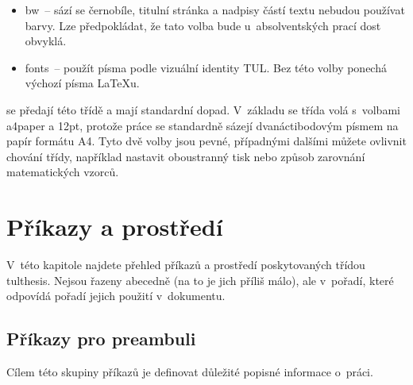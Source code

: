 \documentclass[FZS,DP,EN]{tulthesis}
\newcommand{\argument}[1]{{\ttfamily\color{\tulcolor}#1}}
\newcommand{\argumentindex}[1]{\argument{#1}\index{#1}}
\begin{document}
\begin{description}
\begin{itemize}
\item \argumentindex{bw}~-- sází se černobíle, titulní stránka a nadpisy částí
textu nebudou používat barvy. Lze předpokládat, že tato volba bude
u~absolventských prací dost obvyklá.

\item \argumentindex{fonts}~-- použít písma podle vizuální identity TUL. Bez
této volby ponechá výchozí písma \LaTeX u.
\end{itemize}

\item[Volby třídy \argument{report} (resp. \argument{article})] se předají této
třídě a mají standardní dopad. V~základu se třída volá s~volbami
\argument{a4paper} a \argument{12pt}, protože práce se standardně sázejí
dvanáctibodovým písmem na papír formátu A4. Tyto dvě volby jsou pevné,
případnými dalšími můžete ovlivnit chování třídy, například nastavit
oboustranný tisk nebo způsob zarovnání matematických vzorců.

\end{description}


\chapter{Příkazy a prostředí}

V~této kapitole najdete přehled příkazů a prostředí poskytovaných třídou
\argument{tulthesis}. Nejsou řazeny abecedně (na to je jich příliš málo), ale
v~pořadí, které odpovídá pořadí jejich použití v~dokumentu.


\section{Příkazy pro preambuli}\label{deklarace}

Cílem této skupiny příkazů je definovat důležité popisné informace o~práci.
\end{document}
